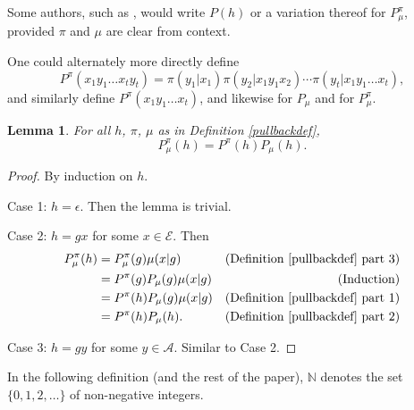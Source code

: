 \documentclass[twoside]{article}
\newtheorem{lemma}[theorem]{Lemma}
\begin{document}
Some authors, such as \cite{hutter2009discrete}, would write $P(h)$ or a variation thereof
for $P^\pi_\mu$, provided $\pi$ and $\mu$ are clear from context.

One could alternately more directly define
\[
    P^\pi(x_1y_1\ldots x_ty_t)
    = \pi(y_1|x_1)\pi(y_2|x_1y_1x_2)\cdots \pi(y_t|x_1y_1\ldots x_t),
\]
and similarly define $P^\pi(x_1y_1\ldots x_t)$,
and likewise for $P_\mu$ and for $P^\pi_\mu$.

\begin{lemma}
\label{factorizationlemma}
    For all $h$, $\pi$, $\mu$ as in Definition \ref{pullbackdef},
    \[
        P^\pi_\mu(h) = P^\pi(h)P_\mu(h).
    \]
\end{lemma}

\begin{proof}
    By induction on $h$.

    Case 1: $h=\epsilon$. Then the lemma is trivial.

    Case 2: $h=gx$ for some $x\in\mathcal E$.
        Then
        \begin{align*}
            P^\pi_\mu(h)
                &= P^\pi_\mu(g)\mu(x|g)
                    &\mbox{(Definition \ref{pullbackdef} part 3)}\\
                &= P^\pi(g)P_\mu(g)\mu(x|g)
                    &\mbox{(Induction)}\\
                &= P^\pi(h)P_\mu(g)\mu(x|g)
                    &\mbox{(Definition \ref{pullbackdef} part 1)}\\
                &= P^\pi(h)P_\mu(h).
                    &\mbox{(Definition \ref{pullbackdef} part 2)}
        \end{align*}

    Case 3: $h=gy$ for some $y\in\mathcal A$.
        Similar to Case 2.
\end{proof}

In the following definition (and the rest of the paper),
$\mathbb N$ denotes the set $\{0,1,2,\ldots\}$ of non-negative
integers.
\end{document}
